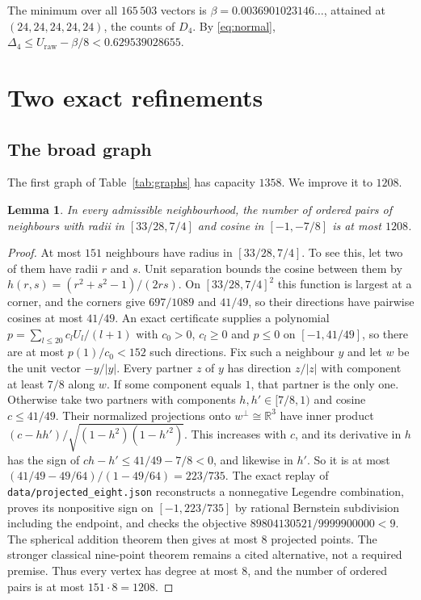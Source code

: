 \documentclass[11pt]{amsart}
\numberwithin{equation}{section}
\newtheorem{lemma}[theorem]{Lemma}
\theoremstyle{remark}
\newcommand{\R}{\mathbb{R}}
\begin{document}
The minimum over all $165\,503$ vectors is $\beta=0.0036901023146\ldots$, attained at $(24,24,24,24,24)$, the counts of $D_4$. By \eqref{eq:normal}, $\Delta_4\le U_{\mathrm{raw}}-\beta/8<0.629539028655$.

\section{Two exact refinements}\label{sec:refine}

\subsection*{The broad graph}
The first graph of Table~\ref{tab:graphs} has capacity $1358$. We improve it to $1208$.

\begin{lemma}\label{lem:1208}
In every admissible neighbourhood, the number of ordered pairs of neighbours with radii in $[33/28,7/4]$ and cosine in $[-1,-7/8]$ is at most $1208$.
\end{lemma}

\begin{proof}
At most $151$ neighbours have radius in $[33/28,7/4]$. To see this, let two of them have radii $r$ and $s$. Unit separation bounds the cosine between them by $h(r,s)=(r^2+s^2-1)/(2rs)$. On $[33/28,7/4]^2$ this function is largest at a corner, and the corners give $697/1089$ and $41/49$, so their directions have pairwise cosines at most $41/49$. An exact certificate supplies a polynomial $p=\sum_{l\le20}c_lU_l/(l+1)$ with $c_0>0$, $c_l\ge0$ and $p\le0$ on $[-1,41/49]$, so there are at most $p(1)/c_0<152$ such directions. Fix such a neighbour $y$ and let $w$ be the unit vector $-y/|y|$. Every partner $z$ of $y$ has direction $z/|z|$ with component at least $7/8$ along $w$. If some component equals $1$, that partner is the only one. Otherwise take two partners with components $h,h'\in[7/8,1)$ and cosine $c\le41/49$. Their normalized projections onto $w^\perp\cong\R^3$ have inner product $(c-hh')/\sqrt{(1-h^2)(1-h'^2)}$. This increases with $c$, and its derivative in $h$ has the sign of $ch-h'\le41/49-7/8<0$, and likewise in $h'$. So it is at most $(41/49-49/64)/(1-49/64)=223/735$. The exact replay of \texttt{data/projected\_eight.json} reconstructs a nonnegative Legendre combination, proves its nonpositive sign on $[-1,223/735]$ by rational Bernstein subdivision including the endpoint, and checks the objective $89804130521/9999900000<9$. The spherical addition theorem then gives at most $8$ projected points. The stronger classical nine-point theorem \cite{SvdW,BM} remains a cited alternative, not a required premise. Thus every vertex has degree at most $8$, and the number of ordered pairs is at most $151\cdot8=1208$.
\end{proof}
\end{document}
